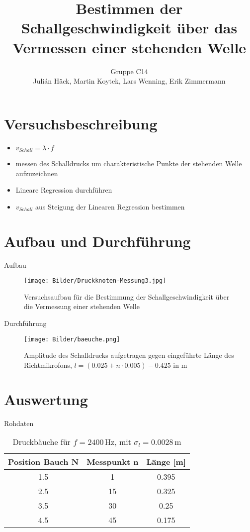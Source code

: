 \documentclass[11pt]{beamer}
\author{Gruppe C14 \\ Julián Häck, Martin Koytek, Lars Wenning, Erik Zimmermann}
\title{Bestimmen der Schallgeschwindigkeit über das Vermessen einer stehenden Welle}
\begin{document}
\section{Versuchsbeschreibung}
\begin{frame}
\begin{itemize}
\item $v_{Schall} = \lambda\cdot f$
\item messen des Schalldrucks um charakteristische Punkte der stehenden Welle aufzuzeichnen
\item Lineare Regression durchführen
\item $v_{Schall}$ aus Steigung der Linearen Regression bestimmen
\end{itemize}
\end{frame}

\section{Aufbau und Durchführung}
\begin{frame}{Aufbau}
\begin{figure}[H]
\centering
\texttt{[image: Bilder/Druckknoten-Messung3.jpg]}
\caption{Versuchsaufbau für die Bestimmung der Schallgeschwindigkeit über die Vermessung einer stehenden Welle}
\end{figure}
\end{frame}

\begin{frame}{Durchführung}
\begin{figure}[H]
\centering
\texttt{[image: Bilder/baeuche.png]}
\caption{Amplitude des Schalldrucks aufgetragen gegen eingeführte Länge des Richtmikrofons, $l = (0.025 + n\cdot 0.005) - 0.425$ in m}
\end{figure}
\end{frame}

\section{Auswertung}
\begin{frame}{Rohdaten}
\begin{table}[H]
\begin{tabular}{c|c|c}
Position Bauch N & Messpunkt n & Länge [m] \\ 
\hline 
1.5 & 1 & 0.395 \\ 
2.5 & 15 & 0.325 \\ 
3.5 & 30 & 0.25 \\ 
4.5 & 45 & 0.175 \\ 
\end{tabular}
\caption{Druckbäuche für $f = 2400\,$Hz, mit $\sigma_l = 0.0028\,$m}
\end{table}
\end{frame}
\end{document}
